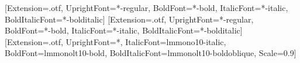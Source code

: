 \usepackage{amsmath,amssymb}
\usepackage{fontspec}%
\usepackage{unicode-math}
\setmainfont{texgyretermes}[Extension=.otf, UprightFont=*-regular,
  BoldFont=*-bold, ItalicFont=*-italic, BoldItalicFont=*-bolditalic]
\setsansfont{texgyreheros}[Extension=.otf, UprightFont=*-regular,
  BoldFont=*-bold, ItalicFont=*-italic, BoldItalicFont=*-bolditalic]
\setmonofont{lmmono10-regular}[Extension=.otf, UprightFont=*,
  ItalicFont=lmmono10-italic, BoldFont=lmmonolt10-bold,
  BoldItalicFont=lmmonolt10-boldoblique, Scale=0.9]
\usepackage{microtype}
\usepackage{graphicx}
\usepackage{adjustbox}
\usepackage{url}
\usepackage{fvextra}
\usepackage{hyperref}
\usepackage{fancyhdr}
\usepackage{titlesec}
\usepackage{newunicodechar}


